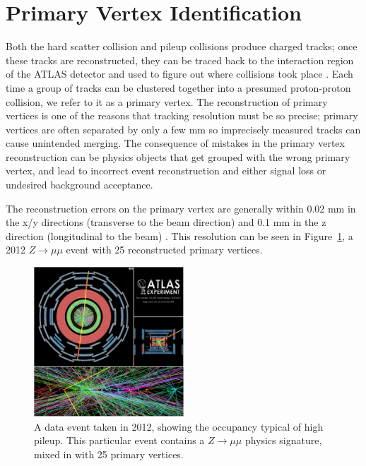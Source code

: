 \section{Primary Vertex Identification}
\label{sec:pv}
Both the hard scatter collision and pileup collisions produce charged tracks; once these tracks are reconstructed, they can 
be traced back to the interaction region of the ATLAS detector and used to figure out where collisions took place
.  Each time a group of tracks can be clustered together into a presumed proton-proton collision, we refer to it 
as a primary vertex.  The reconstruction of primary vertices is one of the reasons that tracking resolution must be 
so precise; primary vertices are often separated by only a few mm so imprecisely measured tracks can cause unintended 
merging.  The consequence of mistakes in the primary vertex reconstruction can be physics objects that get grouped with the 
wrong primary vertex, and lead to incorrect event reconstruction and either signal loss or undesired background acceptance.

The reconstruction errors on the primary vertex are generally within 0.02 mm in the x/y directions 
(transverse to the beam direction) and 0.1 mm in the z direction (longitudinal to the  
beam) \cite{pileup_tracks}.   This resolution can be seen in Figure~\ref{fig:pileup_pv}, a 2012 
$Z\rightarrow\mu\mu$ event with 25 reconstructed primary vertices.



\begin{figure}
    \center
	\includegraphics[width=0.5\textwidth]{ReconstructionPerformance/images/2012_highPileup.pdf}
	\caption{A data event taken in 2012, showing the occupancy typical of high pileup.  This particular event contains a $Z\rightarrow \mu\mu$ physics signature, mixed in with 25 primary vertices.	\label{fig:pileup_pv}  }
\end{figure}


